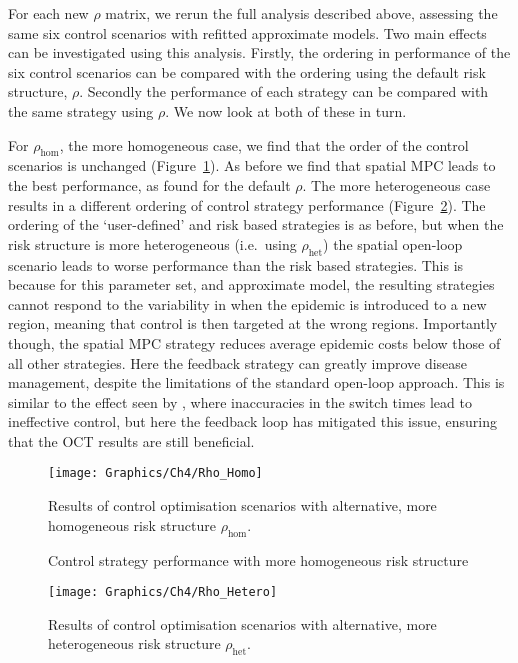 For each new $\rho$ matrix, we rerun the full analysis described above, assessing the same six control scenarios with refitted approximate models. Two main effects can be investigated using this analysis. Firstly, the ordering in performance of the six control scenarios can be compared with the ordering using the default risk structure, $\rho$. Secondly the performance of each strategy can be compared with the same strategy using $\rho$. We now look at both of these in turn.

For $\rho_{\mathrm{hom}}$, the more homogeneous case, we find that the order of the control scenarios is unchanged (Figure~\ref{fig:ch4:rho_homo}). As before we find that spatial MPC leads to the best performance, as found for the default $\rho$. The more heterogeneous case results in a different ordering of control strategy performance (Figure~\ref{fig:ch4:rho_hetero}). The ordering of the `user-defined' and risk based strategies is as before, but when the risk structure is more heterogeneous (i.e.\ using $\rho_{\mathrm{het}}$) the spatial open-loop scenario leads to worse performance than the risk based strategies. This is because for this parameter set, and approximate model, the resulting strategies cannot respond to the variability in when the epidemic is introduced to a new region, meaning that control is then targeted at the wrong regions. Importantly though, the spatial MPC strategy reduces average epidemic costs below those of all other strategies. Here the feedback strategy can greatly improve disease management, despite the limitations of the standard open-loop approach. This is similar to the effect seen by \citet{forster_optimizing_2007}, where inaccuracies in the switch times lead to ineffective control, but here the feedback loop has mitigated this issue, ensuring that the OCT results are still beneficial.

\begin{figure}
    \begin{center}
        \texttt{[image: Graphics/Ch4/Rho\_Homo]}
        \caption{Control strategy performance with more homogeneous risk structure}{Results of control optimisation scenarios with alternative, more homogeneous risk structure $\rho_{\mathrm{hom}}$.}
        \label{fig:ch4:rho_homo}
    \end{center}
\end{figure}

\begin{figure}
    \begin{center}
        \texttt{[image: Graphics/Ch4/Rho\_Hetero]}
        \caption[Control strategy performance with more heterogeneous risk structure]{Results of control optimisation scenarios with alternative, more heterogeneous risk structure $\rho_{\mathrm{het}}$.}
        \label{fig:ch4:rho_hetero}
    \end{center}
\end{figure}

